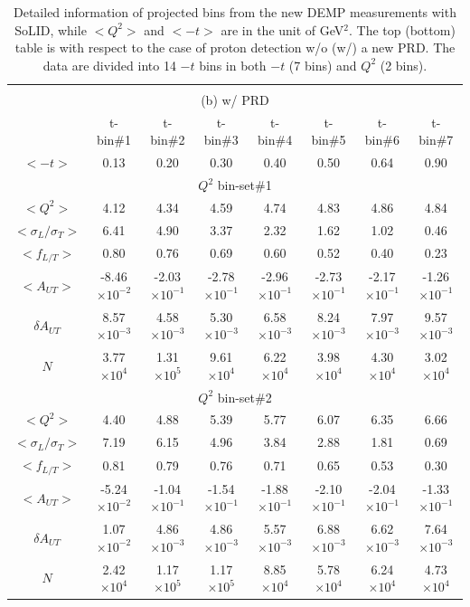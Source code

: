 \begin{table}[!ht]
\begin{tabular}{|c|c|c|c|c|c|c|c|}
\hline
\multicolumn{8}{c}{} \\
\multicolumn{8}{c}{ (b) w/ PRD} \\
\hline
	     &  t-bin\#1 & t-bin\#2 & t-bin\#3 & t-bin\#4 & t-bin\#5 & t-bin\#6 & t-bin\#7 \\
\hline 
$<-t>$       &  0.13 & 0.20   & 0.30   & 0.40   & 0.50   & 0.64   & 0.90  \\
\hline
\multicolumn{8}{|c|}{$Q^{2}$ bin-set\#1 } \\
\hline
$<Q^{2}>$   &  4.12 &  4.34 & 4.59 & 4.74 & 4.83 & 4.86 & 4.84 \\
$<\sigma_{L}/\sigma_{T}>$&  6.41 &  4.90 & 3.37 & 2.32 & 1.62 & 1.02 & 0.46 \\
$<f_{L/T}>$   &  0.80 &  0.76 & 0.69 & 0.60 & 0.52 & 0.40 & 0.23 \\
$<A_{UT}>$ &  -8.46$\times 10^{-2}$ &  -2.03$\times 10^{-1}$ & -2.78$\times 10^{-1}$ & 
-2.96$\times 10^{-1}$ & -2.73$\times 10^{-1}$ & -2.17$\times 10^{-1}$ & -1.26$\times 10^{-1}$ \\
$\delta A_{UT}$&  8.57$\times 10^{-3}$ &  4.58$\times 10^{-3}$ & 5.30$\times 10^{-3}$ & 
6.58$\times 10^{-3}$ & 8.24$\times 10^{-3}$ & 7.97$\times 10^{-3}$ & 9.57$\times 10^{-3}$ \\
$N$     &  3.77$\times 10^{4}$ &  1.31$\times 10^{5}$ & 9.61$\times 10^{4}$ &
6.22$\times 10^{4}$ & 3.98$\times 10^{4}$ & 4.30$\times 10^{4}$ & 3.02$\times 10^{4}$ \\   
\hline
\multicolumn{8}{|c|}{$Q^{2}$ bin-set\#2 } \\
\hline 
$<Q^{2}>$   &  4.40 &  4.88 & 5.39 & 5.77 & 6.07 & 6.35 & 6.66 \\
$<\sigma_{L}/\sigma_{T}>$   &  7.19 &  6.15 & 4.96 & 3.84 & 2.88 & 1.81 & 0.69 \\
$<f_{L/T}>$  &  0.81 &  0.79 & 0.76 & 0.71 & 0.65 & 0.53 & 0.30 \\
$<A_{UT}>$   &  -5.24$\times 10^{-2}$ &  -1.04$\times 10^{-1}$ & -1.54$\times 10^{-1}$ 
& -1.88$\times 10^{-1}$ & -2.10$\times 10^{-1}$ & -2.04$\times 10^{-1}$ & -1.33$\times 10^{-1}$ \\
$\delta A_{UT}$&  1.07$\times 10^{-2}$ &  4.86$\times 10^{-3}$ & 4.86$\times 10^{-3}$ & 
5.57$\times 10^{-3}$ & 6.88$\times 10^{-3}$ & 6.62$\times 10^{-3}$ & 7.64$\times 10^{-3}$ \\
$N$         &  2.42$\times 10^{4}$ &  1.17$\times 10^{5}$ & 1.17$\times 10^{5}$& 8.85$\times 10^{4}$ 
& 5.78$\times 10^{4}$ & 6.24$\times 10^{4}$ & 4.73$\times 10^{4}$ \\
\hline
\end{tabular}
\caption[Detailed information of projected bins]{\footnotesize{Detailed
information of projected bins from the new DEMP measurements with SoLID, while
$<Q^{2}>$ and $<-t>$ are in the unit of GeV$^{2}$. The top (bottom) table is
with respect to the case of proton detection w/o (w/) a new PRD. The data are
divided into 14 $-t$ bins in both $-t$ (7 bins) and $Q^{2}$ (2 bins).}}
\label{asym_bin_table}
\end{table} 

